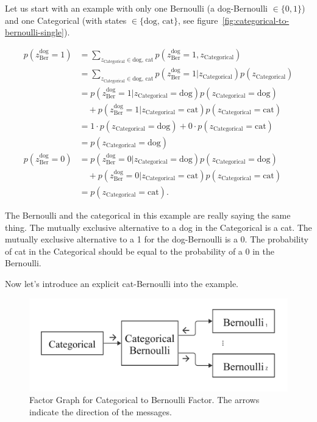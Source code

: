 \documentclass{article}
\begin{document}
Let us start with an example with only one Bernoulli (a dog-Bernoulli $\in \{0,1\}$) and one Categorical (with states $\in \{\text{dog, cat}\}$, see figure~\ref{fig:categorical-to-bernoulli-single}).  

\begin{align}
    p(z^\text{dog}_{\text{Ber}}=1)
    &= \sum_{z_\text{Categorical} \in \text{dog, cat}} p(z^\text{dog}_{\text{Ber}}=1, z_{\text{Categorical}}) \nonumber \\[5pt]
    &= \sum_{z_\text{Categorical} \in \text{dog, cat}} p(z^\text{dog}_{\text{Ber}}=1|z_{\text{Categorical}})p(z_{\text{Categorical}}) \nonumber \\[7pt]
    &= p(z^\text{dog}_{\text{Ber}}=1|z_{\text{Categorical}}=\text{dog})p(z_{\text{Categorical}}=\text{dog}) \\
    &\quad+ p(z^\text{dog}_{\text{Ber}}=1|z_{\text{Categorical}}=\text{cat})p(z_{\text{Categorical}}=\text{cat}) \nonumber \\[5pt]
    &= 1 \cdot p(z_{\text{Categorical}}=\text{dog}) + 0 \cdot p(z_{\text{Categorical}}=\text{cat}) \nonumber \\[5pt]
    &= p(z_{\text{Categorical}}=\text{dog}) \\[7pt]
    p(z^\text{dog}_{\text{Ber}}=0)
    &= p(z^\text{dog}_{\text{Ber}}=0|z_{\text{Categorical}}=\text{dog})p(z_{\text{Categorical}}=\text{dog}) \\
    &\quad+ p(z^\text{dog}_{\text{Ber}}=0|z_{\text{Categorical}}=\text{cat})p(z_{\text{Categorical}}=\text{cat}) \nonumber \\[5pt]
    &= p(z_{\text{Categorical}}=\text{cat}).
\end{align}


The Bernoulli and the categorical in this example are really saying the same thing. The mutually exclusive alternative to a dog in the Categorical is a cat.  The mutually exclusive alternative to a 1 for the dog-Bernoulli is a 0.  The probability of cat in the Categorical should be equal to the probability of a 0 in the Bernoulli.

Now let's introduce an explicit cat-Bernoulli into the example.

\begin{figure}[H]
    \centering
    \includegraphics[scale=0.15]{figures/categorical-bernoulli-message-directions.pdf}
    \caption{Factor Graph for Categorical to Bernoulli Factor.  The arrows indicate the direction of the messages.}
    \label{fig:categorical-to-bernoullis}
\end{figure}
\end{document}

